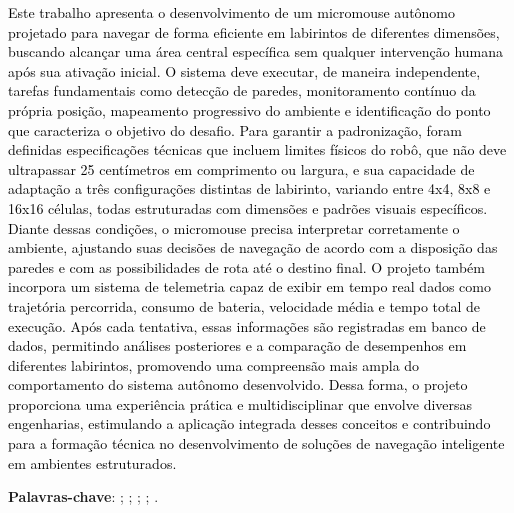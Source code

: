 \begin{resumo}

\textcolor{black}{
Este trabalho apresenta o desenvolvimento de um micromouse autônomo projetado para navegar de forma eficiente em labirintos de diferentes dimensões, buscando alcançar uma área central específica sem qualquer intervenção humana após sua ativação inicial. O sistema deve executar, de maneira independente, tarefas fundamentais como detecção de paredes, monitoramento contínuo da própria posição, mapeamento progressivo do ambiente e identificação do ponto que caracteriza o objetivo do desafio. Para garantir a padronização, foram definidas especificações técnicas que incluem limites físicos do robô, que não deve ultrapassar 25 centímetros em comprimento ou largura, e sua capacidade de adaptação a três configurações distintas de labirinto, variando entre 4x4, 8x8 e 16x16 células, todas estruturadas com dimensões e padrões visuais específicos. Diante dessas condições, o micromouse precisa interpretar corretamente o ambiente, ajustando suas decisões de navegação de acordo com a disposição das paredes e com as possibilidades de rota até o destino final. O projeto também incorpora um sistema de telemetria capaz de exibir em tempo real dados como trajetória percorrida, consumo de bateria, velocidade média e tempo total de execução. Após cada tentativa, essas informações são registradas em banco de dados, permitindo análises posteriores e a comparação de desempenhos em diferentes labirintos, promovendo uma compreensão mais ampla do comportamento do sistema autônomo desenvolvido. Dessa forma, o projeto proporciona uma experiência prática e multidisciplinar que envolve diversas engenharias, estimulando a aplicação integrada desses conceitos e contribuindo para a formação técnica no desenvolvimento de soluções de navegação inteligente em ambientes estruturados.
}

\vspace{\onelineskip}
\noindent
\textbf{Palavras-chave}: \imprimirpalavrachaveum; \imprimirpalavrachavedois; \imprimirpalavrachavetres; \imprimirpalavrachavequatro; \imprimirpalavrachavecinco.

\end{resumo}



